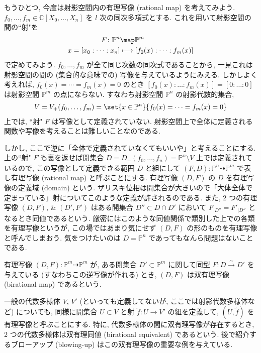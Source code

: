 \documentclass[openany, a4paper, oneside]{jsbook}
\begin{document}
もうひとつ, 今度は射影空間内の有理写像 (rational map) を考えてみよう.
$f_0,\dots,f_m \in \mathbb{C}[X_0,\dots,X_n]$ を $l$ 次の同次多項式とする.
これを用いて射影空間の間の``射"を
\begin{align}
 F \colon \mathbb{P}^n
 &\map
 \mathbb{P}^m \\
 x = [x_0:\dots:x_n]
 &\longmapsto
 [f_0 (x) : \dots : f_m (x)]
\end{align}
で定めてみよう.
$f_0, \dots, f_m$ が全て同じ次数の同次式であることから,
一見これは射影空間の間の (集合的な意味での) 写像を与えているようにみえる.
しかしよく考えれば, $f_0 (x)=\cdots = f_m (x) = 0$ のとき
$[f_0 (x):\dots:f_m (x)] = [0:\dots:0]$ は射影空間 $\mathbb{P}^m$ の点にならない.
すなわち射影空間 $\mathbb{P}^n$ の射影代数的集合,
\begin{align}
 V
 =
 V_+ (f_0, \dots, f_m)
 =
 \set{x \in \mathbb{P}^n}{f_0 (x)= \dots =f_m (x) = 0}
\end{align}
上では, ``射" $F$ は写像として定義されていない.
射影空間上で全体に定義される関数や写像を考えることは難しいことなのである.

しかし, ここで逆に「全体で定義されていなくてもいいや」と考えることにする.
上の``射" $F$ も裏を返せば開集合 $D = D_+ (f_0,\dots,f_n) = \mathbb{P}^n \setminus V$ 上では定義されているので,
この写像として定義できる範囲 $D$ と組にして $(F,D) \colon \mathbb{P}^n \dashrightarrow \mathbb{P}^m$
で表し有理写像 (rational map) と呼ぶことにする.
有理写像 $(D,F)$ の $D$ を有理写像の定義域 (domain) という.
ザリスキ位相は開集合が大きいので「大体全体で定まっている」射についてこのような定義が許されるのである.
また, 2 つの有理写像 $(D,F)$, \& $(D',F')$ はある開集合 $D'' \subset D \cap D'$ において
$F_{|D''} = F'_{|D''}$ となるとき同値であるという.
厳密にはこのような同値関係で類別した上での各類を有理写像というが, この場ではあまり気にせず $(D,F)$ の形のものを有理写像と呼んでしまおう.
気をつけたいのは $D = \mathbb{P}^n$ であってもなんら問題はないことである.

有理写像 $(D,F) \colon \mathbb{P}^m \dashrightarrow \mathbb{P}^m$ が,
ある開集合 $D' \subset \mathbb{P}^m$ に関して同型 $F \colon D \xrightarrow{\sim} D'$ を与えている (すなわちこの逆写像が作れる) とき,
$(D,F)$ は双有理写像 (birational map) であるという.

一般の代数多様体 $V$, $V'$ (といっても定義してないが, ここでは射影代数多様体など) についても,
同様に開集合 $U \subset V$ と射 $\tilde{f} \colon U \to V'$ の組を定義して,
$(U,\tilde{f})$ を有理写像と呼ぶことにする.
特に, 代数多様体の間に双有理写像が存在するとき, 2 つの代数多様体は双有理同値 (birational equivalent) であるという.
後で紹介するブローアップ (blowing-up) はこの双有理写像の重要な例を与えている.
\end{document}
